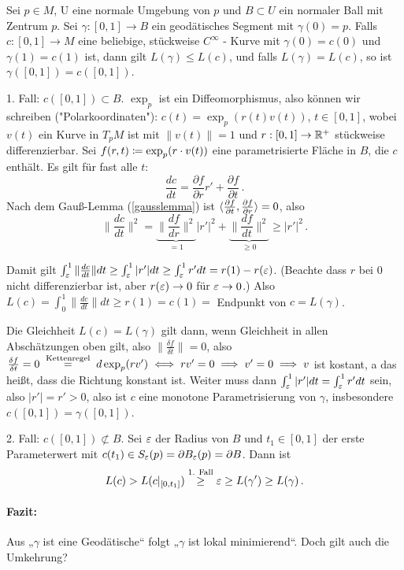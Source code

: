 \documentclass[a4paper,twoside,DIV15,BCOR12mm]{scrbook}
\begin{document}
\begin{satz}
\label{geolokmin}
Sei $p \in M$, U eine normale Umgebung von $p$ und $B \subset U$ ein normaler Ball mit Zentrum $p$. Sei $\gamma: [0,1] \to B$ ein geodätisches Segment mit $\gamma(0)=p$. Falls $c:[0,1] \to M$ eine beliebige, stückweise $C^\infty$ - Kurve mit $\gamma(0)=c(0)$ und $\gamma(1)=c(1)$ ist, dann gilt $L(\gamma) \le L(c)$, und falls $L(\gamma)=L(c)$, so ist $\gamma([0,1]) = c([0,1])$.
\end{satz}
\begin{beweis}
1. Fall: $c([0,1]) \subset B$. $\exp_p$ ist ein Diffeomorphismus, also können wir schreiben ("Polarkoordinaten"):
$c(t)=\exp_p(r(t)v(t))$, $t \in [0,1]$, wobei $v(t)$ ein Kurve in $T_pM$  ist mit $\|v(t)\|=1$ und $r:[0,1] \to \mathbb{R}^+$ stückweise differenzierbar. Sei $f(r,t) \da \exp_p(r\cdot v(t))$ eine parametrisierte Fläche in $B$, die $c$ enthält. Es gilt für fast alle $t$: 
\[ \frac{dc}{dt}=\frac{\partial f}{\partial r}r' + \frac{\partial f}{\partial t}\,.
\]
Nach dem Gauß-Lemma (\ref{gausslemma}) ist $\langle\frac{\partial f}{\partial t},\frac{\partial f}{\partial r}\rangle = 0$, also 
\[
\|\frac{dc}{dt}\|^2 = \underbrace{\|\frac{df}{dr}\|^2}_{=1} |r'|^2 + \underbrace{\|\frac{df}{dt}\|^2}_{\ge 0} \ge |r'|^2\,.
\]

Damit gilt $\int_\varepsilon^1 \|\frac{dc}{dt}\| dt \ge \int_\varepsilon^1|r'|dt \ge \int_\varepsilon^1r'dt = r(1) - r(\varepsilon)$. (Beachte dass $r$ bei 0 nicht differenzierbar ist, aber $r(\varepsilon) \to 0$ für $\varepsilon \to 0$.) Also $L(c) = \int_0^1\|\frac{dc}{dt}\| dt \ge r(1) = c(1) = $ Endpunkt von $c = L(\gamma)$.

Die Gleichheit $L(c) = L(\gamma)$ gilt dann, wenn Gleichheit in allen Abschätzungen oben gilt, also $\|\frac{\delta f}{\delta t}\| = 0$, also $\frac{\delta f}{\delta t} = 0 \gleichnach{Kettenregel} d\exp_p(rv') \gdw rv'= 0\folgt v'=0 \folgt v$ ist kostant, a das heißt, dass die Richtung konstant ist. Weiter muss dann $\int_\varepsilon^1 |r'|dt = \int_\varepsilon^1 r' dt$ sein, also $|r'| = r' >0$, also ist $c$ eine monotone Parametrisierung von $\gamma$, insbesondere $c([0,1]) = \gamma([0,1])$.

2. Fall: $c([0,1]) \not\subset B$. Sei $\varepsilon$ der Radius von $B$ und $t_1\in [0,1]$ der erste Parameterwert mit $c(t_1) \in S_\varepsilon(p) = \partial B_\varepsilon (p) = \partial B$. Dann ist
\[
L(c) > L(c|_{[0,t_1]}) \stackrel{\text{1. Fall}}\ge \varepsilon \ge L(\gamma') \ge L(\gamma)\,.
\]
\end{beweis}

\paragraph{Fazit:} Aus „$\gamma$ ist eine Geodätische“ folgt „$\gamma$ ist lokal minimierend“. Doch gilt auch die Umkehrung?
\end{document}
